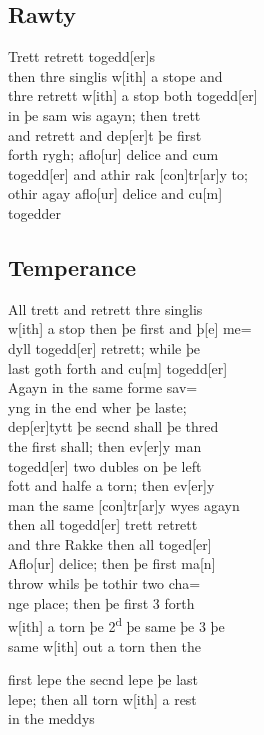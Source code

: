 \documentclass[12pt,letter]{article} %
\newcommand{\srcpg}[1]{
    \noindent{
        \color{Gray}{\rule[0.5ex]{\linewidth}{1pt}~#1} 
    
    }
}
\begin{document}
\subsection{Rawty}
Trett retrett togedd{[}er{]}s\\
then thre singlis w{[}ith{]} a stope and\\
thre retrett w{[}ith{]} a stop both togedd{[}er{]}\\
in þe sam wis agayn; then trett\\
and retrett and dep{[}er{]}t þe first\\
forth rygh; aflo{[}ur{]} delice and cum\\
togedd{[}er{]} and athir rak {[}con{]}tr{[}ar{]}y to;\\
othir agay aflo{[}ur{]} delice and cu{[}m{]}\\
togedder

\srcpg{70}

\subsection{Temperance}
 All trett and retrett thre singlis\\
w{[}ith{]} a stop then þe first and þ{[}e{]} me=\\
dyll togedd{[}er{]} retrett; while þe\\
last goth forth and cu{[}m{]} togedd{[}er{]}\\
Agayn in the same forme sav=\\
yng in the end wher þe laste;\\
dep{[}er{]}tytt þe secnd shall þe thred\\
the first shall; then ev{[}er{]}y man\\
togedd{[}er{]} two dubles on þe left\\
fott and halfe a torn; then ev{[}er{]}y\\
man the same {[}con{]}tr{[}ar{]}y wyes agayn\\
then all togedd{[}er{]} trett retrett\\
and thre Rakke then all toged{[}er{]}\\
Aflo{[}ur{]} delice; then þe first ma{[}n{]}\\
throw whils þe tothir two cha=\\
nge place; then þe first 3 forth\\
w{[}ith{]} a torn þe 2\textsuperscript{d} þe same þe 3 þe\\
same w{[}ith{]} out a torn then the 
\srcpg{71} 
first lepe the secnd lepe þe last\\
lepe; then all torn w{[}ith{]} a rest\\
in the meddys
\end{document}

